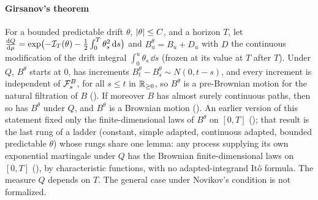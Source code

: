 \documentclass[11pt]{article}
\begin{document}
\paragraph{Girsanov's theorem}
For a bounded predictable drift $\theta$, $\lvert \theta\rvert\le C$, and a horizon $T$, let
$\frac{\mathrm{d} Q}{\mathrm{d}\mu}=\exp\bigl(-\mathcal{I}_T(\theta)-\frac12\int_0^T\theta_s^2\,\mathrm{d} s\bigr)$ and
$B^\theta_u=B_u+D_u$ with $D$ the continuous modification of the drift integral $\int_0^u\theta_s\,\dd s$ (frozen at
its value at $T$ after $T$). Under $Q$, $B^\theta$ starts at $0$, has increments $B^\theta_t-B^\theta_s\sim N(0,t-s)$,
and every increment is independent of $\mathcal{F}^B_s$, for all $s\le t$ in $\mathbb{R}_{\ge0}$, so $B^\theta$ is a pre-Brownian
motion for the natural filtration of $B$ (). If moreover $B$ has
almost surely continuous paths, then so has $B^\theta$ under $Q$, and $B^\theta$ is a Brownian motion
(). An earlier version of this statement fixed only the
finite-dimensional laws of $B^\theta$ on $[0,T]$ (); that result is
the last rung of a ladder (constant, simple adapted, continuous adapted, bounded predictable $\theta$) whose rungs
share one lemma: any process supplying its own exponential martingale under $Q$ has the Brownian
finite-dimensional laws on $[0,T]$ (), by characteristic functions, with no
adapted-integrand It\^o formula. The measure $Q$ depends on $T$. The general case under Novikov's condition is not
formalized.
\end{document}
